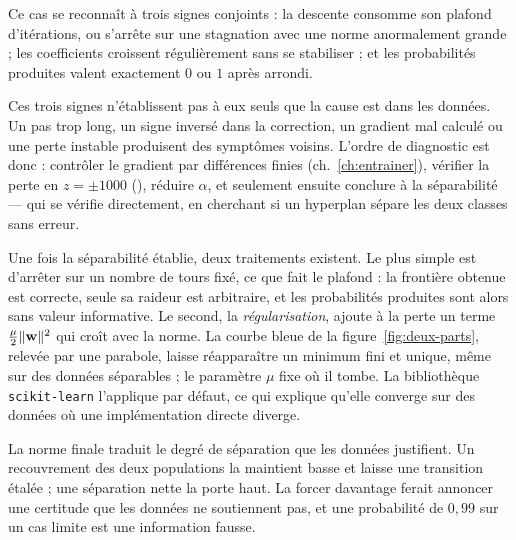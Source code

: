 \begin{vigilance}
Ce cas se reconnaît à trois signes conjoints : la descente consomme son plafond
d'itérations, ou s'arrête sur une stagnation avec une norme anormalement grande ;
les coefficients croissent régulièrement sans se stabiliser ; et les probabilités
produites valent exactement $0$ ou $1$ après arrondi.

Ces trois signes n'établissent pas à eux seuls que la cause est dans les
données. Un pas trop long, un signe inversé dans la correction, un gradient mal
calculé ou une perte instable produisent des symptômes voisins. L'ordre de
diagnostic est donc : contrôler le gradient par différences finies
(ch.~\ref{ch:entrainer}), vérifier la perte en $z=\pm1000$
(), réduire $\alpha$, et seulement ensuite conclure à la
séparabilité --- qui se vérifie directement, en cherchant si un hyperplan sépare
les deux classes sans erreur.

Une fois la séparabilité établie, deux traitements existent. Le plus simple est
d'arrêter sur un nombre de tours fixé, ce que fait le plafond : la frontière
obtenue est correcte, seule sa raideur est arbitraire, et les probabilités
produites sont alors sans valeur informative. Le second, la
\emph{régularisation}, ajoute à la perte un terme $\frac{\mu}{2}\|\mathbf{w}\|^2$ qui
croît avec la norme. La courbe bleue de la figure~\ref{fig:deux-parts}, relevée
par une parabole, laisse réapparaître un minimum fini et unique, même sur des
données séparables ; le paramètre $\mu$ fixe où il tombe. La bibliothèque
\texttt{scikit-learn} l'applique par défaut, ce qui explique qu'elle converge sur
des données où une implémentation directe diverge.
\end{vigilance}

\begin{resultat}
La norme finale traduit le degré de séparation que les données justifient. Un
recouvrement des deux populations la maintient basse et laisse une transition
étalée ; une séparation nette la porte haut. La forcer davantage ferait annoncer
une certitude que les données ne soutiennent pas, et une probabilité de $0{,}99$
sur un cas limite est une information fausse.
\end{resultat}
